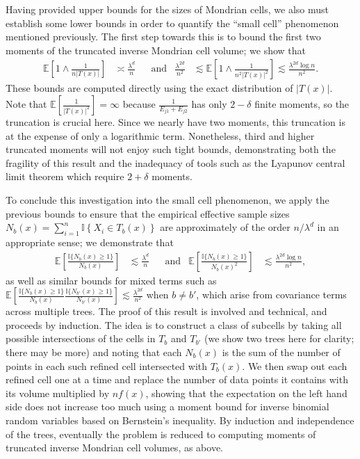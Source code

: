 \documentclass[11pt,lof]{puthesis}
\newcommand{\E}{\ensuremath{\mathbb{E}}}
\newcommand{\I}{\ensuremath{\mathbb{I}}}
\theoremstyle{break}
\theoremstyle{proof}
\begin{document}
Having provided upper bounds for the sizes of Mondrian cells, we also must
establish some lower bounds in order to quantify the ``small cell'' phenomenon
mentioned previously. The first step towards this is to bound the first two
moments of the truncated inverse Mondrian cell volume; we show that
%
\begin{align*}
\E\left[ 1 \wedge \frac{1}{n |T(x)|} \right]
&\asymp \frac{\lambda^d}{n}
&&\text{and}
&\frac{\lambda^{2d}}{n^2}
&\lesssim
\E\left[ 1 \wedge \frac{1}{n^2 |T(x)|^2} \right]
\lesssim \frac{\lambda^{2d} \log n}{n^2}.
\end{align*}
%
These bounds are computed directly using the exact distribution of $|T(x)|$.
Note that $\E\left[ \frac{1}{|T(x)|^2} \right] = \infty$ because
$\frac{1}{E_{j1} + E_{j2}}$ has only $2 - \delta$ finite moments, so the
truncation is crucial here. Since we nearly have two moments, this
truncation is at the expense of only a logarithmic term. Nonetheless, third and
higher truncated moments will not enjoy such tight bounds, demonstrating both
the fragility of this result and the inadequacy of tools such as the Lyapunov
central limit theorem which require $2 + \delta$ moments.

To conclude this investigation into the small cell phenomenon, we apply the
previous bounds to ensure that the empirical effective sample sizes
$N_b(x) = \sum_{i=1}^{n} \I \left\{ X_i \in T_b(x) \right\}$ are approximately
of the order $n / \lambda^d$ in an appropriate sense; we demonstrate that
%
\begin{align*}
\E\left[ \frac{\I\{N_b(x) \geq 1\}}{N_b(x)} \right]
&\lesssim \frac{\lambda^d}{n}
&&\text{and}
&\E\left[ \frac{\I\{N_b(x) \geq 1\}}{N_b(x)^2} \right]
&\lesssim \frac{\lambda^{2d} \log n}{n^2},
\end{align*}
%
as well as similar bounds for mixed terms such as
%
$\E \left[
\frac{\I\{N_b(x) \geq 1\}}{N_b(x)}
\frac{\I\{N_{b'}(x) \geq 1\}}{N_{b'}(x)}
\right]
\lesssim \frac{\lambda^{2d}}{n^2}$
%
when $b \neq b'$, which arise from covariance terms across multiple trees. The
proof of this result is involved and technical, and proceeds by induction. The
idea is to construct a class of subcells by taking all possible intersections
of the cells in $T_b$ and $T_{b'}$ (we show two trees here for clarity; there
may be more) and noting that each $N_b(x)$ is the sum of the number of points
in each such refined cell intersected with $T_b(x)$. We then swap out each
refined cell one at a time and replace the number of data points it contains
with its volume multiplied by $n f(x)$, showing that the expectation on the
left hand side does not increase too much using a moment bound for inverse
binomial random variables based on Bernstein's inequality. By induction and
independence of the trees, eventually the problem is reduced to computing
moments of truncated inverse Mondrian cell volumes, as above.
\end{document}

